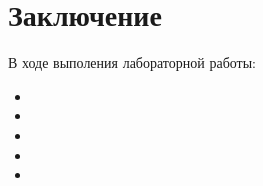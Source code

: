 \chapter*{Заключение}

В ходе выполения лабораторной работы:

\begin{itemize}[left=\parindent]
    \item
    \item
    \item
    \item
    \item
\end{itemize}
